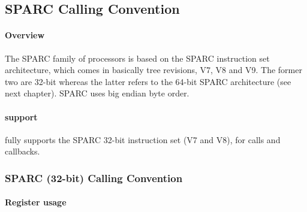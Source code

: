 %
%
%
%

\subsection{SPARC Calling Convention}

\paragraph{Overview}

The SPARC family of processors is based on the SPARC instruction set architecture, which comes in basically tree revisions,
V7, V8\cite{SPARCV8}\cite{SPARCSysV} and V9\cite{SPARCV9}\cite{SPARCV9SysV}. The former two are 32-bit whereas the latter refers to the 64-bit SPARC architecture (see next chapter).
SPARC uses big endian byte order.\\

\paragraph{ support}

 fully supports the SPARC 32-bit instruction set (V7 and V8), for calls and callbacks.

\subsubsection{SPARC (32-bit) Calling Convention}

\paragraph{Register usage}

